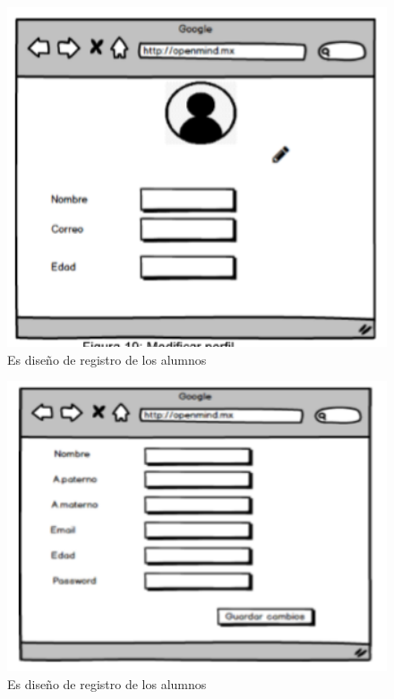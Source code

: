 \documentclass[letterpaper,oneside,openany,11pt]{book}
\begin{document}
 \begin{figure}[H]
	\centering
	\includegraphics[width=1.0\textwidth]{./Imagenes/39}
	\caption{Es diseño de registro de los alumnos}
\end{figure}

 \begin{figure}[H]
	\centering
	\includegraphics[width=1.0\textwidth]{./Imagenes/40}
	\caption{Es diseño de registro de los alumnos}
\end{figure}
\end{document}
